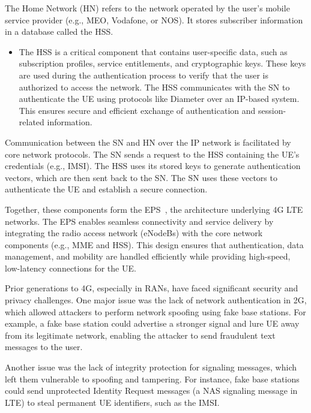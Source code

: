 The Home Network (\ac{HN}) refers to the network operated by the user's mobile service provider (e.g., MEO, Vodafone, or NOS). It stores subscriber information in a database called the \ac{HSS}.

\begin{itemize}
    \item {
          The \ac{HSS} is a critical component that contains user-specific data, such as subscription profiles, service entitlements, and cryptographic keys. These keys are used during the authentication process to verify that the user is authorized to access the network. The \ac{HSS} communicates with the \ac{SN} to authenticate the \ac{UE} using protocols like Diameter over an IP-based system. This ensures secure and efficient exchange of authentication and session-related information.
          }
\end{itemize}

Communication between the \ac{SN} and \ac{HN} over the IP network is facilitated by core network protocols. The \ac{SN} sends a request to the \ac{HSS} containing the \ac{UE}’s credentials (e.g., \ac{IMSI}). The \ac{HSS} uses its stored keys to generate authentication vectors, which are then sent back to the \ac{SN}. The \ac{SN} uses these vectors to authenticate the \ac{UE} and establish a secure connection.

Together, these components form the \ac{EPS}~\cite{cbl-comp-4G-5g-p3}, the architecture underlying \ac{4G} \ac{LTE} networks. The \ac{EPS} enables seamless connectivity and service delivery by integrating the radio access network (\acp{eNodeB}) with the core network components (e.g., \ac{MME} and \ac{HSS}). This design ensures that authentication, data management, and mobility are handled efficiently while providing high-speed, low-latency connections for the \ac{UE}.

Prior generations to \ac{4G}, especially in \acp{RAN}, have faced significant security and privacy challenges. One major issue was the lack of network authentication in \ac{2G}, which allowed attackers to perform network spoofing using fake base stations. For example, a fake base station could advertise a stronger signal and lure \ac{UE} away from its legitimate network, enabling the attacker to send fraudulent text messages to the user.

Another issue was the lack of integrity protection for signaling messages, which left them vulnerable to spoofing and tampering. For instance, fake base stations could send unprotected Identity Request messages (a \ac{NAS} signaling message in \ac{LTE}) to steal permanent \ac{UE} identifiers, such as the \ac{IMSI}.

